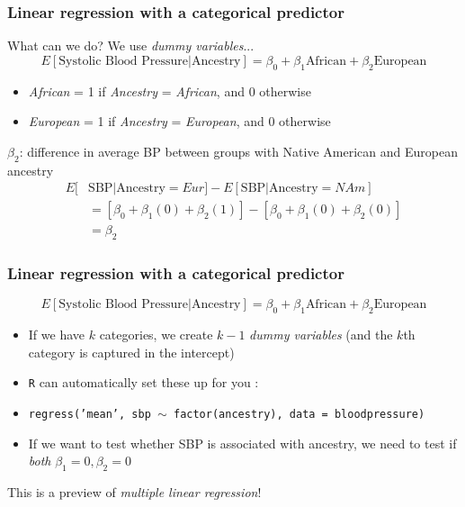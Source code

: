 \documentclass[12pt, 
hyperref={colorlinks=true, linkcolor=blue, urlcolor=cyan},dvipsnames]{beamer}
\begin{document}
\begin{frame}
\frametitle{Linear regression with a categorical predictor}
What can we do? We use \textit{dummy variables}...
$$E[\text{Systolic Blood Pressure}|\text{Ancestry}] = \beta_0 + \beta_1 \text{African} + \beta_2 \text{European}$$

\vspace{-0.5cm}
\begin{itemize}
\item \textit{African} = 1 if \textit{Ancestry} = \textit{African}, and 0 otherwise
\item \textit{European} = 1 if \textit{Ancestry} = \textit{European}, and 0 otherwise
\end{itemize}

$\beta_2$: difference in average BP between groups with Native American and European ancestry
\begin{align*}
E[&\text{SBP}|\text{Ancestry} = Eur] - E[\text{SBP}|\text{Ancestry} = NAm] \\
&= \left[\beta_0 + \beta_1(0) + \beta_2(1)\right] - \left[\beta_0 + \beta_1(0) + \beta_2(0) \right] \\
& = \beta_2
\end{align*}
\end{frame}

\begin{frame}
\frametitle{Linear regression with a categorical predictor}
$$E[\text{Systolic Blood Pressure}|\text{Ancestry}] = \beta_0 + \beta_1 \text{African} + \beta_2 \text{European}$$

\vspace{-0.3cm}
\begin{itemize}
\item If we have $k$ categories, we create $k-1$ \textit{dummy variables} (and the $k$th category is captured in the intercept)
\item \texttt{R} can automatically set these up for you :
\item[] \texttt{regress('mean', sbp $\sim$ factor(ancestry), data = bloodpressure)}
\item If we want to test whether SBP is associated with ancestry, we need to test if \textit{both} $\beta_1 = 0, \beta_2 = 0$
\end{itemize}

This is a preview of \textit{multiple linear regression}!

\end{frame}
\end{document}
